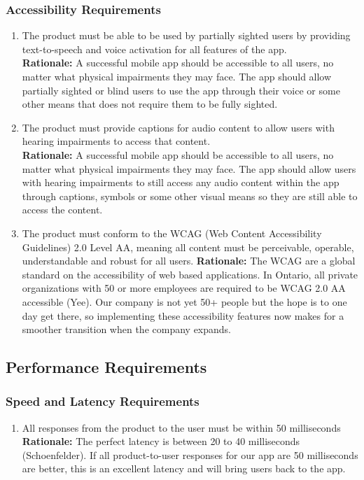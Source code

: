 \documentclass[]{article}
\begin{document}
\subsubsection{Accessibility Requirements}
\label{ssub:accessibility_requirements}
\begin{enumerate}[{UH-A}1. ]
	\item The product must be able to be used by partially sighted users by providing text-to-speech and voice activation for all features of the app. \\
	{\bf Rationale:} A successful mobile app should be accessible to all users, no matter what physical impairments they may face. The app should allow partially sighted or blind users to use the app through their voice or some other means that does not require them to be fully sighted.
	\item The product must provide captions for audio content to allow users with hearing impairments to access that content. \\
	{\bf Rationale:} A successful mobile app should be accessible to all users, no matter what physical impairments they may face. The app should allow users with hearing impairments to still access any audio content within the app through captions, symbols or some other visual means so they are still able to access the content.
	\item The product must conform to the WCAG (Web Content Accessibility Guidelines) 2.0 Level AA, meaning all content must be perceivable, operable, understandable and robust for all users.
	{\bf Rationale:} The WCAG are a global standard on the accessibility of web based applications. In Ontario, all private organizations with 50 or more employees are required to be WCAG 2.0 AA accessible (Yee). Our company is not yet 50+ people but the hope is to one day get there, so implementing these accessibility features now makes for a smoother transition when the company expands.
\end{enumerate}


\subsection{Performance Requirements}
\label{sub:performance_requirements}

\subsubsection{Speed and Latency Requirements}
\label{ssub:speed_and_latency_requirements}
\begin{enumerate}[{PR-SL}1. ]
	\item All responses from the product to the user must be within 50 milliseconds \\
	{\bf Rationale:} The perfect latency is between 20 to 40 milliseconds (Schoenfelder). If all product-to-user responses for our app are 50 milliseconds are better, this is an excellent latency and will bring users back to the app.
\end{enumerate}
\end{document}
